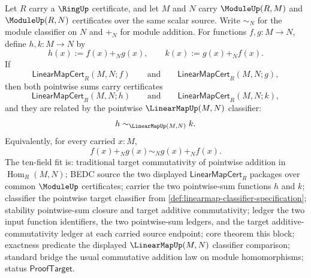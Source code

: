 \begin{theorem}
\label{thm:module-linearmap-pointwise-sum-commutativity}
Let $R$ carry a $\RingUp$ certificate, and let $M$ and $N$ carry $\ModuleUp(R,M)$ and $\ModuleUp(R,N)$ certificates over the same scalar source. Write $\sim_N$ for the module classifier on $N$ and $+_N$ for module addition. For functions $f,g:M\to N$, define $h,k:M\to N$ by
$$
h(x):=f(x)+_N g(x),
\qquad
k(x):=g(x)+_N f(x).
$$
If
$$
\mathsf{LinearMapCert}_R(M,N;f)
\qquad\text{and}\qquad
\mathsf{LinearMapCert}_R(M,N;g),
$$
then both pointwise sums carry certificates
$$
\mathsf{LinearMapCert}_R(M,N;h)
\qquad\text{and}\qquad
\mathsf{LinearMapCert}_R(M,N;k),
$$
and they are related by the pointwise $\LinearMapUp(M,N)$ classifier:
$$
h\sim_{\LinearMapUp(M,N)}k.
$$
Equivalently, for every carried $x:M$,
$$
f(x)+_N g(x)\sim_N g(x)+_N f(x).
$$
The ten-field fit is: traditional target commutativity of pointwise addition in $\operatorname{Hom}_R(M,N)$; BEDC source the two displayed $\mathsf{LinearMapCert}_R$ packages over common $\ModuleUp$ certificates; carrier the two pointwise-sum functions $h$ and $k$; classifier the pointwise target classifier from \autoref{def:linearmap-classifier-specification}; stability pointwise-sum closure and target additive commutativity; ledger the two input function identifiers, the two pointwise-sum ledgers, and the target additive-commutativity ledger at each carried source endpoint; core theorem this block; exactness predicate the displayed $\LinearMapUp(M,N)$ classifier comparison; standard bridge the usual commutative addition law on module homomorphisms; status $\mathsf{ProofTarget}$.
\end{theorem}
